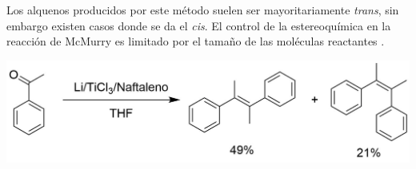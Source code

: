 \documentclass[fleqn,11pt]{SelfArx}
\begin{document}
Los alquenos producidos por este m\'etodo suelen ser mayoritariamente \textit{trans}, sin embargo existen casos donde se da el \textit{cis}. El control de la estereoqu\'imica en la reacci\'on de McMurry es limitado por el tama\~no de las mol\'eculas reactantes \cite{Rele2001, Wang2010}.
\pagebreak

\begin{scheme}[h]
	\centering
	\includegraphics[width=0.8\linewidth]{structures/EZselectivity.png}
	\caption{La selectividad de la reacci\'on est\'a dada por el tamaño de la mol\'ecula \cite{Rele2001, Wang2010}.}
\end{scheme}
\end{document}

